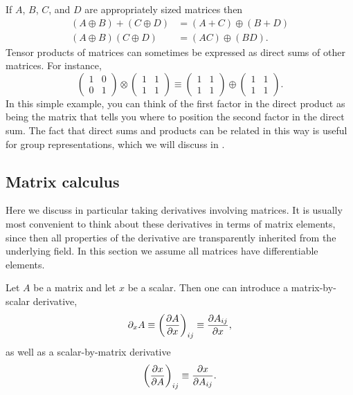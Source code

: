 If $A$, $B$, $C$, and $D$ are appropriately sized matrices then
\begin{equation}\begin{aligned}
(A\oplus B)+(C\oplus D)&=(A+C)\oplus(B+D)\\
(A\oplus B)(C\oplus D)&=(AC)\oplus(BD).
\end{aligned}\end{equation}
Tensor products of matrices can sometimes be expressed
as direct sums of other matrices. For instance,
\begin{equation}
\left(\begin{array}{cc}
1 & 0 \\
0 & 1
\end{array}\right) \otimes\left(\begin{array}{cc}
1 & 1 \\
1 & 1
\end{array}\right) \equiv\left(\begin{array}{cc}
1 & 1 \\
1 & 1
\end{array}\right) \oplus\left(\begin{array}{cc}
1 & 1 \\
1 & 1
\end{array}\right).
\end{equation}
In this simple example, you can think of the first factor
in the direct product as being the matrix that tells you where to position the
second factor in the direct sum. The fact that direct sums and products can be
related in this way is useful for group representations, which we will
discuss in .

\subsection{Matrix calculus}\label{sec:matrixCalculus} 

Here we discuss in particular taking derivatives involving matrices.
It is usually most convenient to think about these derivatives in terms of
matrix elements, since then all properties of the derivative are transparently
inherited from the underlying field. In this section we assume all matrices have
differentiable elements.

Let $A$ be a matrix and let $x$ be a scalar. Then one can
introduce a matrix-by-scalar derivative,
\begin{equation}
\partial_x A\equiv\left(\pdv{A}{x}\right)_{ij}\equiv\pdv{A_{ij}}{x},
\end{equation}
as well as a scalar-by-matrix derivative
\begin{equation}
\left(\pdv{x}{A}\right)_{ij}\equiv\pdv{x}{A_{ij}}.
\end{equation}


